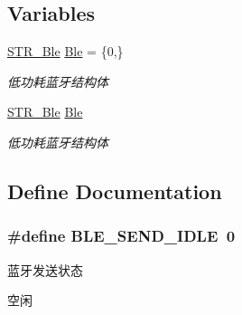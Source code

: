 \subsection*{\-Variables}
\begin{DoxyCompactItemize}
\item 
\hypertarget{group___b_l_e_gabe0f82c09c4ace8e0767f4b4ab756c0a}{\hyperlink{struct_s_t_r___ble}{\-S\-T\-R\-\_\-\-Ble} \hyperlink{group___b_l_e_gabe0f82c09c4ace8e0767f4b4ab756c0a}{\-Ble} = \{0,\}}\label{group___b_l_e_gabe0f82c09c4ace8e0767f4b4ab756c0a}

\begin{DoxyCompactList}\small\item\em 低功耗蓝牙结构体 \end{DoxyCompactList}\item 
\hypertarget{group___b_l_e_gabe0f82c09c4ace8e0767f4b4ab756c0a}{\hyperlink{struct_s_t_r___ble}{\-S\-T\-R\-\_\-\-Ble} \hyperlink{group___b_l_e_gabe0f82c09c4ace8e0767f4b4ab756c0a}{\-Ble}}\label{group___b_l_e_gabe0f82c09c4ace8e0767f4b4ab756c0a}

\begin{DoxyCompactList}\small\item\em 低功耗蓝牙结构体 \end{DoxyCompactList}\end{DoxyCompactItemize}


\subsection{\-Define \-Documentation}
\hypertarget{group___b_l_e_gaf5f8c77ba9a9819251362bc1d7f5f045}{
\subsubsection[{\-B\-L\-E\-\_\-\-S\-E\-N\-D\-\_\-\-I\-D\-L\-E}]{\setlength{\rightskip}{0pt plus 5cm}\#define {\bf \-B\-L\-E\-\_\-\-S\-E\-N\-D\-\_\-\-I\-D\-L\-E}~0}}\label{group___b_l_e_gaf5f8c77ba9a9819251362bc1d7f5f045}


蓝牙发送状态 

空闲 

